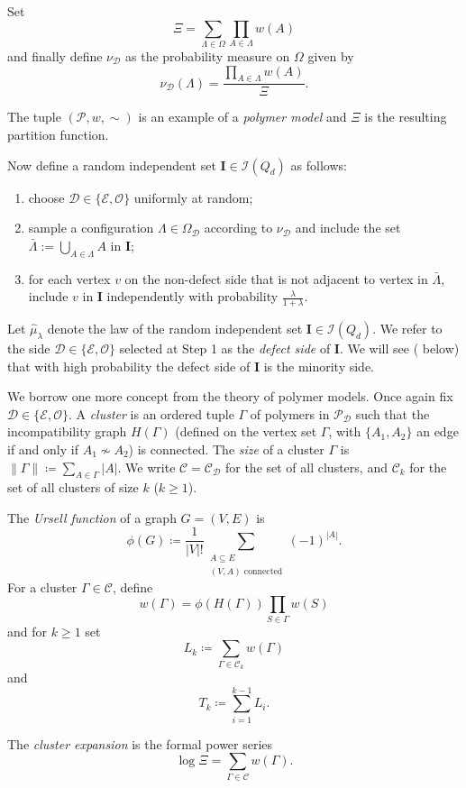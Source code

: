 \documentclass[10pt,a4paper]{amsart}
\theoremstyle{definition}
\newcommand{\cO}{\mathcal{O} }
\newcommand{\cC}{\mathcal{C} }
\newcommand{\cD}{\mathcal{D} }
\newcommand{\cE}{\mathcal{E} }
\newcommand{\cI}{\mathcal{I} }
\newcommand{\cP}{\mathcal{P} }
\newcommand{\nin}[0]{\noindent}
\newcommand{\0}[0]{\emptyset}
\newcommand{\lam}{\lambda}
\begin{document}
Set
\[\Xi=\sum_{\Lambda\in\Omega} \prod_{A\in \Lambda} w(A)\]
and finally define $\nu_\cD$ as the probability measure on $\Omega$ given by
\[ \nu_\cD (\Lambda)=\frac{\prod_{A\in\Lambda} w(A)}{\Xi}.\]

\nin The tuple $(\cP, w, \sim)$ is an example of a \emph{polymer model} and $\Xi$ is the resulting partition function.

Now define a random independent set $\mathbf{ I}\in\cI(Q_d)$ as follows:
\begin{enumerate}
    \item choose $\cD\in\{\cE,\cO\}$ uniformly at random;\label{Step1}
    \item sample a configuration $\Lambda\in\Omega_\cD$ according to $\nu_\cD$ and include the set $\bar\Lambda:=\bigcup_{A\in\Lambda}A$ in $\mathbf{I}$;\label{Step2}
    \item for each vertex $v$ on the non-defect side that is not adjacent to  vertex in $\bar\Lambda$, include $v$ in $\mathbf{I}$ independently with probability $\frac{\lam}{1+\lam}$.\label{Step3}
\end{enumerate}
Let $\hat{\mu}_\lam$ denote the law of the random independent set $\mathbf{I}\in\cI(Q_d)$. We refer to the side $\cD\in\{\cE,\cO\}$ selected at Step 1 as the \emph{defect side} of $\mathbf{I}$. We will see ( below) that with high probability the defect side of $\mathbf{I}$ is the minority side. 

We borrow one more concept from the theory of  polymer models. Once again fix $\cD\in\{\cE,\cO\}$. A \emph{cluster} is an ordered tuple $\Gamma$ of polymers in $\cP_\cD$ such that the incompatibility graph $H(\Gamma)$ (defined on the vertex set $\Gamma$, with $\{A_1,A_2\}$ an edge if and only if $A_1\not\sim A_2$) is connected. The \emph{size} of a cluster $\Gamma$ is $\|\Gamma\|\coloneqq \sum_{A\in\Gamma} |A|$. We write $\cC=\cC_\cD$ for the set of all clusters, and $\cC_k$ for the set of all clusters of size $k$ ($k\geq 1$).

The \emph{Ursell function} of a graph $G=(V,E)$ is
\[ \phi(G)\coloneqq \frac{1}{|V|!} \sum_{\substack{A\subseteq E \\ (V,A)\text{ connected}}} (-1)^{|A|}.  \]
For a cluster $\Gamma\in\cC$, define
\[ w(\Gamma)=\phi(H(\Gamma))\prod_{S\in\Gamma} w(S)\]
and for $k\geq 1$  set
\[ L_k\coloneqq \sum_{\Gamma\in\cC_k} w(\Gamma)\]
and
\[ T_k\coloneqq \sum_{i=1}^{k-1} L_i.\]

The \emph{cluster expansion} is the formal power series
\[ \log \Xi = \sum_{\Gamma\in \cC} w(\Gamma).\]
\end{document}
